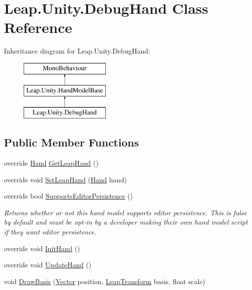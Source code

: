 \hypertarget{class_leap_1_1_unity_1_1_debug_hand}{}\section{Leap.\+Unity.\+Debug\+Hand Class Reference}
\label{class_leap_1_1_unity_1_1_debug_hand}
Inheritance diagram for Leap.\+Unity.\+Debug\+Hand\+:\begin{figure}[H]
\begin{center}
\leavevmode
\includegraphics[height=3.000000cm]{class_leap_1_1_unity_1_1_debug_hand}
\end{center}
\end{figure}
\subsection*{Public Member Functions}
\begin{DoxyCompactItemize}
\item 
override \mbox{\hyperlink{class_leap_1_1_hand}{Hand}} \mbox{\hyperlink{class_leap_1_1_unity_1_1_debug_hand_a406218fbf7d947d156064ccc5ac84d06}{Get\+Leap\+Hand}} ()
\item 
override void \mbox{\hyperlink{class_leap_1_1_unity_1_1_debug_hand_a22cf0421f70d6ab4129c169116d0d83c}{Set\+Leap\+Hand}} (\mbox{\hyperlink{class_leap_1_1_hand}{Hand}} hand)
\item 
override bool \mbox{\hyperlink{class_leap_1_1_unity_1_1_debug_hand_ab2f2c81a42220b3b96cbdabadbfefd17}{Supports\+Editor\+Persistence}} ()
\begin{DoxyCompactList}\small\item\em Returns whether or not this hand model supports editor persistence. This is false by default and must be opt-\/in by a developer making their own hand model script if they want editor persistence. \end{DoxyCompactList}\item 
override void \mbox{\hyperlink{class_leap_1_1_unity_1_1_debug_hand_a504064bb8442d990fbd080bda3c1c02c}{Init\+Hand}} ()
\item 
override void \mbox{\hyperlink{class_leap_1_1_unity_1_1_debug_hand_a72947d57d9e6eaabade4aa289d5052bd}{Update\+Hand}} ()
\item 
void \mbox{\hyperlink{class_leap_1_1_unity_1_1_debug_hand_abb49cc3a3a3716e71a59c193fe7e58b1}{Draw\+Basis}} (\mbox{\hyperlink{struct_leap_1_1_vector}{Vector}} position, \mbox{\hyperlink{struct_leap_1_1_leap_transform}{Leap\+Transform}} basis, float scale)
\end{DoxyCompactItemize}
